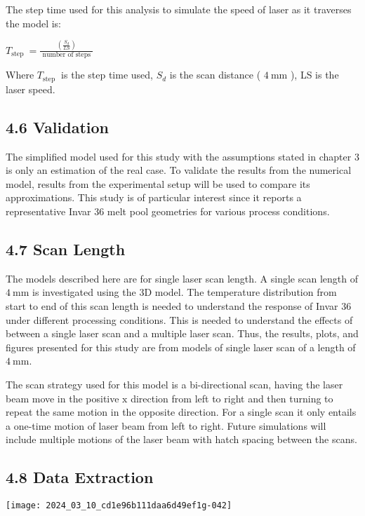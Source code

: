 \documentclass[10pt]{article}
\begin{document}
The step time used for this analysis to simulate the speed of laser as it traverses the model is:

$T_{\text {step }}=\frac{\left(\frac{S_{d}}{L S}\right)}{\text { number of steps }}$

Where $T_{\text {step }}$ is the step time used, $S_{d}$ is the scan distance ( $4 \mathrm{~mm}$ ), LS is the laser speed.

\subsection*{4.6 Validation}
The simplified model used for this study with the assumptions stated in chapter 3 is only an estimation of the real case. To validate the results from the numerical model, results from the experimental setup will be used to compare its approximations. This study is of particular interest since it reports a representative Invar 36 melt pool geometries for various process conditions.

\subsection*{4.7 Scan Length}
The models described here are for single laser scan length. A single scan length of $4 \mathrm{~mm}$ is investigated using the 3D model. The temperature distribution from start to end of this scan length is needed to understand the response of Invar 36 under different processing conditions. This is needed to understand the effects of between a single laser scan and a multiple laser scan. Thus, the results, plots, and figures presented for this study are from models of single laser scan of a length of $4 \mathrm{~mm}$.

The scan strategy used for this model is a bi-directional scan, having the laser beam move in the positive $\mathrm{x}$ direction from left to right and then turning to repeat the same motion in the opposite direction. For a single scan it only entails a one-time motion of laser beam from left to right. Future simulations will include multiple motions of the laser beam with hatch spacing between the scans.

\subsection*{4.8 Data Extraction}
\begin{center}
\texttt{[image: 2024\_03\_10\_cd1e96b111daa6d49ef1g-042]}
\end{center}
\end{document}
